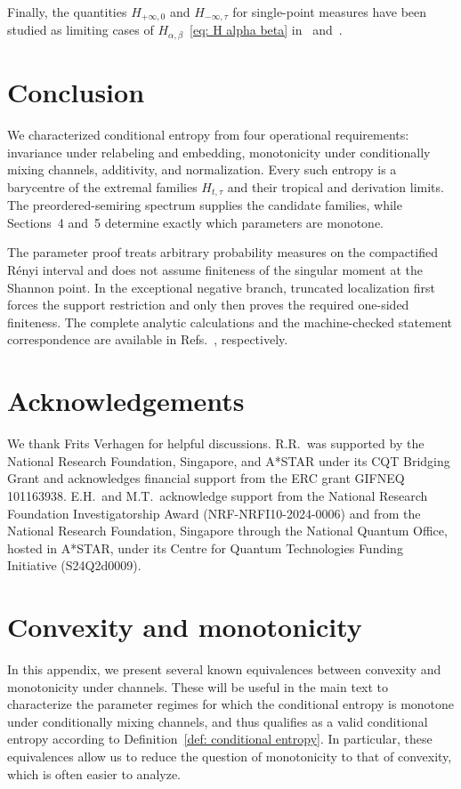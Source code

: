 \documentclass[aps,pra,11pt,onecolumn,nofootinbib,tightenlines]{revtex4-2}
\theoremstyle{definition}
\begin{document}
Finally, the quantities $ H_{+\infty,0}$ and $H_{-\infty,\tau}$ for single-point measures have been studied as limiting cases of
$H_{\alpha,\beta}$~\eqref{eq: H alpha beta} in~\cite{li2025two} and~\cite{rubboli2024quantum}.





\section{Conclusion}

We characterized conditional entropy from four operational requirements:
invariance under relabeling and embedding, monotonicity under conditionally
mixing channels, additivity, and normalization.  Every such entropy is a
barycentre of the extremal families $H_{t,\tau}$ and their tropical and
derivation limits.  The preordered-semiring spectrum supplies the candidate
families, while Sections~4 and~5 determine exactly which parameters are
monotone.

The parameter proof treats arbitrary probability measures on the compactified
R\'enyi interval and does not assume finiteness of the singular moment at the
Shannon point.  In the exceptional negative branch, truncated localization
first forces the support restriction and only then proves the required
one-sided finiteness.  The complete analytic calculations and the
machine-checked statement correspondence are available in
Refs.~\cite{rubboli2026parametersFull,rubboli2026parametersLean},
respectively.




\section{Acknowledgements}
We thank Frits Verhagen for helpful discussions. R.R.\ was supported by the National Research Foundation, Singapore, and A*STAR under its CQT Bridging Grant and acknowledges financial support from the ERC grant GIFNEQ 101163938. E.H.\ and M.T.\ acknowledge support from the National Research Foundation Investigatorship Award (NRF-NRFI10-2024-0006) and from the National Research Foundation, Singapore through the National Quantum Office, hosted in A*STAR, under its Centre for Quantum Technologies Funding Initiative (S24Q2d0009).






\newpage
\appendix

\section{Convexity and monotonicity}
\label{app: convexity and monotonicity}
In this appendix, we present several known equivalences between convexity and monotonicity under channels. These will be useful in the main text to characterize the parameter regimes for which the conditional entropy is monotone under conditionally mixing channels, and thus qualifies as a valid conditional entropy according to Definition~\ref{def: conditional entropy}. In particular, these equivalences allow us to reduce the question of monotonicity to that of convexity, which is often easier to analyze.
\end{document}
